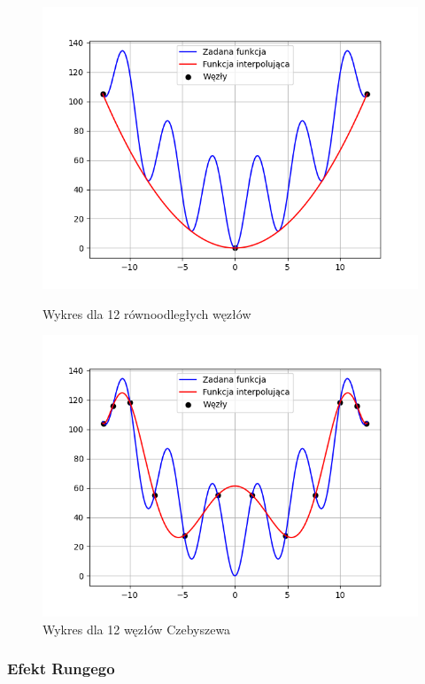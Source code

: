 \documentclass{article}
\begin{document}
\begin{figure}[H]
  \begin{minipage}[b]{0.49\textwidth}
    \includegraphics[width=\textwidth]{img01.png}
    \caption{Wykres dla 12 równoodległych węzłów}
  \end{minipage}
  \hfill
  \begin{minipage}[b]{0.49\textwidth}
    \includegraphics[width=\textwidth]{img02.png}
    \caption{Wykres dla 12 węzłów Czebyszewa}
  \end{minipage}
\end{figure}

\subsubsection{Efekt Rungego}
\end{document}
